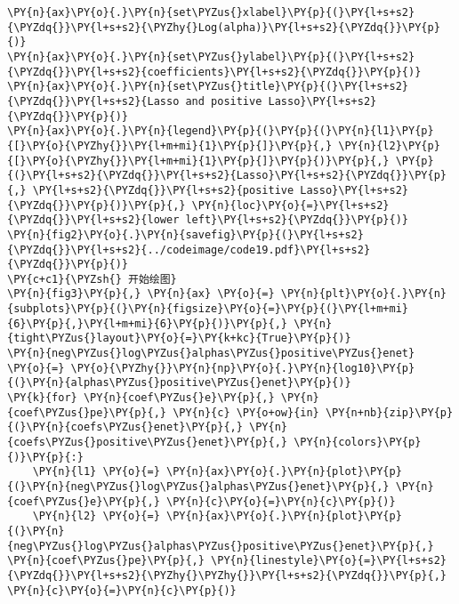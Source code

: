 \begin{Verbatim}[commandchars=\\\{\}]
\PY{n}{ax}\PY{o}{.}\PY{n}{set\PYZus{}xlabel}\PY{p}{(}\PY{l+s+s2}{\PYZdq{}}\PY{l+s+s2}{\PYZhy{}Log(alpha)}\PY{l+s+s2}{\PYZdq{}}\PY{p}{)}
\PY{n}{ax}\PY{o}{.}\PY{n}{set\PYZus{}ylabel}\PY{p}{(}\PY{l+s+s2}{\PYZdq{}}\PY{l+s+s2}{coefficients}\PY{l+s+s2}{\PYZdq{}}\PY{p}{)}
\PY{n}{ax}\PY{o}{.}\PY{n}{set\PYZus{}title}\PY{p}{(}\PY{l+s+s2}{\PYZdq{}}\PY{l+s+s2}{Lasso and positive Lasso}\PY{l+s+s2}{\PYZdq{}}\PY{p}{)}
\PY{n}{ax}\PY{o}{.}\PY{n}{legend}\PY{p}{(}\PY{p}{(}\PY{n}{l1}\PY{p}{[}\PY{o}{\PYZhy{}}\PY{l+m+mi}{1}\PY{p}{]}\PY{p}{,} \PY{n}{l2}\PY{p}{[}\PY{o}{\PYZhy{}}\PY{l+m+mi}{1}\PY{p}{]}\PY{p}{)}\PY{p}{,} \PY{p}{(}\PY{l+s+s2}{\PYZdq{}}\PY{l+s+s2}{Lasso}\PY{l+s+s2}{\PYZdq{}}\PY{p}{,} \PY{l+s+s2}{\PYZdq{}}\PY{l+s+s2}{positive Lasso}\PY{l+s+s2}{\PYZdq{}}\PY{p}{)}\PY{p}{,} \PY{n}{loc}\PY{o}{=}\PY{l+s+s2}{\PYZdq{}}\PY{l+s+s2}{lower left}\PY{l+s+s2}{\PYZdq{}}\PY{p}{)}
\PY{n}{fig2}\PY{o}{.}\PY{n}{savefig}\PY{p}{(}\PY{l+s+s2}{\PYZdq{}}\PY{l+s+s2}{../codeimage/code19.pdf}\PY{l+s+s2}{\PYZdq{}}\PY{p}{)}
\PY{c+c1}{\PYZsh{} 开始绘图}
\PY{n}{fig3}\PY{p}{,} \PY{n}{ax} \PY{o}{=} \PY{n}{plt}\PY{o}{.}\PY{n}{subplots}\PY{p}{(}\PY{n}{figsize}\PY{o}{=}\PY{p}{(}\PY{l+m+mi}{6}\PY{p}{,}\PY{l+m+mi}{6}\PY{p}{)}\PY{p}{,} \PY{n}{tight\PYZus{}layout}\PY{o}{=}\PY{k+kc}{True}\PY{p}{)}
\PY{n}{neg\PYZus{}log\PYZus{}alphas\PYZus{}positive\PYZus{}enet} \PY{o}{=} \PY{o}{\PYZhy{}}\PY{n}{np}\PY{o}{.}\PY{n}{log10}\PY{p}{(}\PY{n}{alphas\PYZus{}positive\PYZus{}enet}\PY{p}{)}
\PY{k}{for} \PY{n}{coef\PYZus{}e}\PY{p}{,} \PY{n}{coef\PYZus{}pe}\PY{p}{,} \PY{n}{c} \PY{o+ow}{in} \PY{n+nb}{zip}\PY{p}{(}\PY{n}{coefs\PYZus{}enet}\PY{p}{,} \PY{n}{coefs\PYZus{}positive\PYZus{}enet}\PY{p}{,} \PY{n}{colors}\PY{p}{)}\PY{p}{:}
    \PY{n}{l1} \PY{o}{=} \PY{n}{ax}\PY{o}{.}\PY{n}{plot}\PY{p}{(}\PY{n}{neg\PYZus{}log\PYZus{}alphas\PYZus{}enet}\PY{p}{,} \PY{n}{coef\PYZus{}e}\PY{p}{,} \PY{n}{c}\PY{o}{=}\PY{n}{c}\PY{p}{)}
    \PY{n}{l2} \PY{o}{=} \PY{n}{ax}\PY{o}{.}\PY{n}{plot}\PY{p}{(}\PY{n}{neg\PYZus{}log\PYZus{}alphas\PYZus{}positive\PYZus{}enet}\PY{p}{,} \PY{n}{coef\PYZus{}pe}\PY{p}{,} \PY{n}{linestyle}\PY{o}{=}\PY{l+s+s2}{\PYZdq{}}\PY{l+s+s2}{\PYZhy{}\PYZhy{}}\PY{l+s+s2}{\PYZdq{}}\PY{p}{,} \PY{n}{c}\PY{o}{=}\PY{n}{c}\PY{p}{)}


\end{Verbatim}
